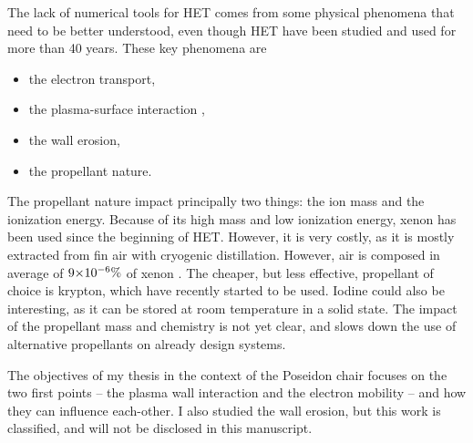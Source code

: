 The lack of numerical tools for \ac{HET} comes from some physical phenomena that need to be better understood, even though \ac{HET} have been studied and used for more than 40 years.
These key phenomena are \citep{samukawa2012,adamovich2017}
\begin{itemize}
  \item the electron transport,
  \item the plasma-surface interaction ,
  \item the wall erosion,
  \item the propellant nature.
\end{itemize}

\vspace{1em}
The propellant nature impact principally two things\string: the ion mass and the ionization energy.
Because of its high mass and low ionization energy, xenon has been used since the beginning of \ac{HET}. 
However, it is very costly, as it is mostly extracted from fin air with cryogenic distillation.
However, air is composed in average of ${{9}{\times}10^{-6}}\%$ of xenon \citep{earthfacs}.
The cheaper, but less effective, propellant of choice is krypton, which have recently started to be used.
Iodine could also be interesting, as it can be stored at room temperature in a solid state.
The impact of the propellant mass and chemistry is not yet clear, and slows down the use of alternative propellants on already design systems.

\vspace{1em}
The objectives of my thesis in the context of the {\sc Poseidon} chair focuses on the two first points -- the plasma wall interaction and the electron mobility -- and how they can influence each-other.
I also studied the wall erosion, but this work is classified, and will not be disclosed in this manuscript.





